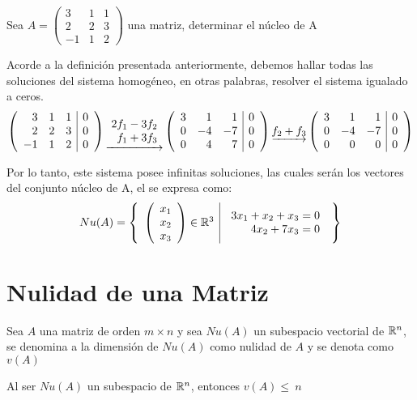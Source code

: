 \begin{ejemplo}
Sea $A=
\left(
\begin{array}{rrr}
3&1&1\\
2&2&3\\
-1&1&2
\end{array}
\right)$ una matriz, determinar el núcleo de A
 
Acorde a la definición presentada anteriormente, debemos hallar todas las soluciones del sistema homogéneo, en otras palabras, resolver el sistema igualado a ceros.
$$\reducir{{rrr|l}}{3&1&1&0\\2&2&3&0\\-1&1&2&0}
\underrightarrow{\begin{array}{r}
    2f_1 - 3f_2 \\
    f_1 + 3f_3
\end{array}}
\reducir{rrr|l}{3&1&1&0\\0&-4&-7&0\\0&4&7&0}
\underrightarrow{f_2 + f_3}
\reducir{rrr|l}{3&1&1&0\\0&-4&-7&0\\0&0&0&0}$$

Por lo tanto, este sistema posee infinitas soluciones, las cuales serán los vectores del conjunto núcleo de A, el se expresa como:
\[Nu(A)= \left\{\begin{array}{c|c} {\left( \begin{array}{c} x_1\\ x_2\\ x_3 \end{array}\right) \in \mathbb{R}^3 }&{\begin{array}{r}
    3x_1 + x_2 + x_3 = 0  \\
    4x_2 + 7x_3 = 0 
\end{array}} \end{array} \right\}
\]

\end{ejemplo}

\section{Nulidad de una Matriz}
\begin{dfn}
Sea $A$ una matriz de orden $m\times n$ y sea $Nu(A)$ un subespacio vectorial de $\mathbb{R}^n$, se denomina a la dimensión de $Nu(A)$ como nulidad de $A$ y se denota como $v(A)$ 
\end{dfn}
\begin{theorem}[Corolario]
Al ser $Nu(A)$ un subespacio de $\mathbb{R}^n$, entonces $v(A) \leq~n$
\end{theorem} 


